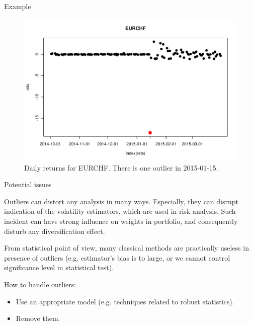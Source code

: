 \documentclass{beamer}
\begin{document}
\begin{frame}{Example}

\begin{figure}
    \centering
    \includegraphics[width=1\textwidth]{../wykresy/EURCHF}
    \caption{Daily returns for EURCHF. There is one outlier in 2015-01-15.}
\end{figure}

\end{frame}

\begin{frame}{Potential issues}

Outliers can distort any analysis in many ways. Especially, they can disrupt indication of the volatility estimators, which are used in risk analysis. Such incident can have strong influence on weights in portfolio, and consequently disturb any diversification effect.

From statistical point of view, many classical methods are practically useless in presence of outliers (e.g. estimator's bias is to large, or we cannot control significance level in statistical test).

\end{frame}

\begin{frame}{How to handle outliers:}

\Large
\begin{itemize}
\item Use an appropriate model (e.g. techniques related to robust statistics).
\item Remove them.
\end{itemize}


\end{frame}
\end{document}
